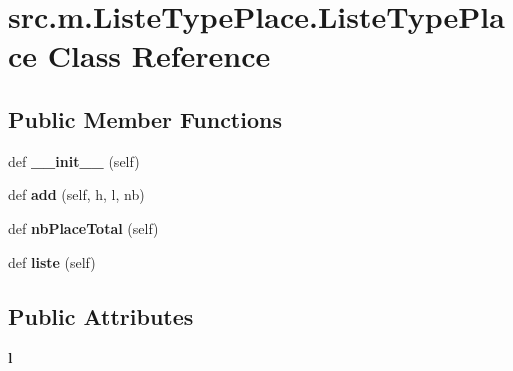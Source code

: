 \hypertarget{classsrc_1_1m_1_1_liste_type_place_1_1_liste_type_place}{}\section{src.\+m.\+Liste\+Type\+Place.\+Liste\+Type\+Place Class Reference}
\label{classsrc_1_1m_1_1_liste_type_place_1_1_liste_type_place}
\subsection*{Public Member Functions}
\begin{DoxyCompactItemize}
\item 
\hypertarget{classsrc_1_1m_1_1_liste_type_place_1_1_liste_type_place_a81686c007814bd163dd4a986a032a228}{}def {\bfseries \+\_\+\+\_\+init\+\_\+\+\_\+} (self)\label{classsrc_1_1m_1_1_liste_type_place_1_1_liste_type_place_a81686c007814bd163dd4a986a032a228}

\item 
\hypertarget{classsrc_1_1m_1_1_liste_type_place_1_1_liste_type_place_ac713976f8ddfe100260c5c4397998afa}{}def {\bfseries add} (self, h, l, nb)\label{classsrc_1_1m_1_1_liste_type_place_1_1_liste_type_place_ac713976f8ddfe100260c5c4397998afa}

\item 
\hypertarget{classsrc_1_1m_1_1_liste_type_place_1_1_liste_type_place_a46fae01f17bddd2e166c6403381640b1}{}def {\bfseries nb\+Place\+Total} (self)\label{classsrc_1_1m_1_1_liste_type_place_1_1_liste_type_place_a46fae01f17bddd2e166c6403381640b1}

\item 
\hypertarget{classsrc_1_1m_1_1_liste_type_place_1_1_liste_type_place_a652a0eca265fc7835f2a324f5b5e358d}{}def {\bfseries liste} (self)\label{classsrc_1_1m_1_1_liste_type_place_1_1_liste_type_place_a652a0eca265fc7835f2a324f5b5e358d}

\end{DoxyCompactItemize}
\subsection*{Public Attributes}
\begin{DoxyCompactItemize}
\item 
\hypertarget{classsrc_1_1m_1_1_liste_type_place_1_1_liste_type_place_a047f9182690d522b25307d691f480df7}{}{\bfseries l}\label{classsrc_1_1m_1_1_liste_type_place_1_1_liste_type_place_a047f9182690d522b25307d691f480df7}

\end{DoxyCompactItemize}


